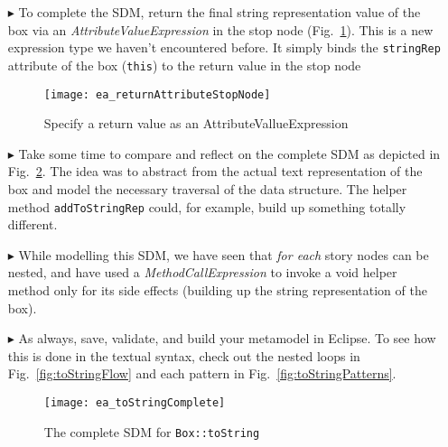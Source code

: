 \begin{itemize}
\item[$\blacktriangleright$] To complete the SDM, return the final string representation value of the box via an \emph{AttributeValueExpression} in
the stop node (Fig.~\ref{fig:toStringStopNode}). This is a new expression type we haven't encountered before. It simply
binds the \texttt{stringRep} attribute of the box (\texttt{this}) to the return value in the stop node

\newpage

\begin{figure}[htbp]
\begin{center}
  \texttt{[image: ea\_returnAttributeStopNode]}
  \caption{Specify a return value as an AttributeVallueExpression}
  \label{fig:toStringStopNode}
\end{center}
\end{figure}

\vspace{0.5cm}

\item[$\blacktriangleright$] Take some time to compare and reflect on the complete SDM as depicted in Fig.~\ref{fig:sdm_tostring_5}.  The idea was to abstract
from the actual text representation of the box and model the necessary traversal of the data structure. The helper method \texttt{addToStringRep} could, for
example, build up something totally different.

\vspace{0.5cm}

\item[$\blacktriangleright$] While modelling this SDM, we have seen that \emph{for each} story nodes can be nested, and have used a \emph{MethodCallExpression}
to invoke a void helper method only for its side effects (building up the string representation of the box).

\vspace{0.5cm}

\item[$\blacktriangleright$] As always, save, validate, and build your metamodel in Eclipse. To see how this is done in the
textual syntax, check out the nested loops in Fig.~\ref{fig:toStringFlow} and each pattern in Fig.~\ref{fig:toStringPatterns}.

\newpage

\vspace*{2cm}

\begin{figure}[htbp]
\begin{center}
  \texttt{[image: ea\_toStringComplete]}
  \caption{The complete SDM for \texttt{Box::toString}}  
  \label{fig:sdm_tostring_5}
\end{center}
\end{figure}
\FloatBarrier


\end{itemize}
